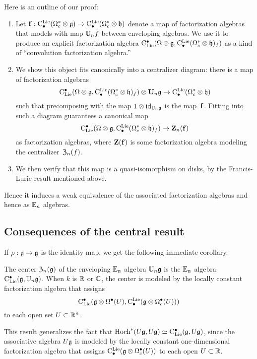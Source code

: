 \documentclass[11pt]{amsart}
\numberwithin{equation}{section}
\begin{document}
Here is an outline of our proof:
\begin{enumerate}
\item Let ${\bf f}: {\rm C}^{\rm Lie}_\bullet(\Omega_c^* \otimes \mathfrak g) \to {\rm C}^{\rm Lie}_\bullet(\Omega_c^* \otimes \mathfrak h)$ denote a map of factorization algebras that models with map $\mathbb U_n f$ between enveloping algebras. 
We use it to produce an explicit factorization algebra ${\rm C}_{\rm Lie}^\bullet(\Omega \otimes \mathfrak g, {\rm C}^{\rm Lie}_\bullet(\Omega_c^* \otimes \mathfrak h)_f)$ as a kind of ``convolution factorization algebra.'' 
\item We show this object fits canonically into a centralizer diagram: there is a map of factorization algebras
\[
{\rm C}_{\rm Lie}^\bullet(\Omega \otimes \mathfrak g, {\rm C}^{\rm Lie}_\bullet(\Omega_c^* \otimes \mathfrak h)_f) \otimes \mathbf U_n \mathfrak g \to {\rm C}^{\rm Lie}_\bullet(\Omega_c^* \otimes \mathfrak h)
\]
such that precomposing with the map $1 \otimes {\rm id}_{\mathbb U_n \mathfrak g}$ is the map~${\bf f}$.
Fitting into such a diagram guarantees a canonical map 
\[
{\rm C}_{\rm Lie}^\bullet(\Omega \otimes \mathfrak g, {\rm C}^{\rm Lie}_\bullet(\Omega_c^* \otimes \mathfrak h)_f) \to \mathbf Z_n({\bf f})
\]
as factorization algebras, where $\mathbf Z({\bf f})$ is some factorization algebra modeling the centralizer~${\frak Z}_n(f)$. 
\item We then verify that this map is a quasi-isomorphism on disks, by the Francis-Lurie result mentioned above. 
\end{enumerate}
Hence it induces a weak equivalence of the associated factorization algebras and hence as $\mathbb E_n$ algebras. 

\subsection{Consequences of the central result}

If $\rho: \mathfrak g \to \mathfrak g$ is the identity map, we get the following immediate corollary.

\begin{cor}
\label{thm: center}
The center ${\frak Z}_n(\mathfrak g)$ of the enveloping $\mathbb E_n$ algebra $\mathbb U_n\mathfrak g$ is the $\mathbb E_n$ algebra ${\rm C}_{\rm Lie}^\bullet(\mathfrak g, \mathbb U_n\mathfrak g)$. 
When $k$ is $\mathbb R$ or $\mathbb C$, the 
center is modeled by the locally constant factorization algebra that assigns
\[
{\rm C}_{\rm Lie}^\bullet(\mathfrak g \otimes \Omega^\bullet(U), {\rm C}^{\rm Lie}_\bullet( \mathfrak g \otimes \Omega^\bullet_c(U)))
\]
to each open set $U \subset \mathbb R^n$.
\end{cor}

This result generalizes the fact that ${\rm Hoch}^*(U\mathfrak g,U\mathfrak g) \simeq {\rm C}_{\rm Lie}^\bullet(\mathfrak g, U\mathfrak g)$, 
since the associative algebra $U\mathfrak g$ is modeled by the locally constant one-dimensional factorization algebra that assigns
${\rm C}^{\rm Lie}_\bullet (\mathfrak g \otimes \Omega^\bullet_c(U))$ to each open $U \subset \mathbb R$. 
\end{document}
